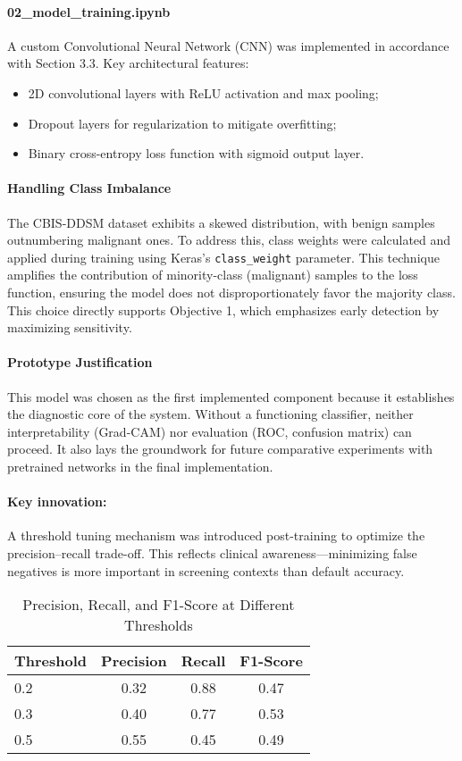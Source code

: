 \documentclass[12pt]{article}
\begin{document}
\paragraph{02\_model\_training.ipynb}
A custom Convolutional Neural Network (CNN) was implemented in accordance with Section 3.3. Key architectural features:
\begin{itemize}
    \item 2D convolutional layers with ReLU activation and max pooling;
    \item Dropout layers for regularization to mitigate overfitting;
    \item Binary cross-entropy loss function with sigmoid output layer.
\end{itemize}

\paragraph{Handling Class Imbalance} The CBIS-DDSM dataset exhibits a skewed distribution, with benign samples outnumbering malignant ones. To address this, class weights were calculated and applied during training using Keras’s \texttt{class\_weight} parameter. This technique amplifies the contribution of minority-class (malignant) samples to the loss function, ensuring the model does not disproportionately favor the majority class. This choice directly supports Objective 1, which emphasizes early detection by maximizing sensitivity.

\paragraph{Prototype Justification} This model was chosen as the first implemented component because it establishes the diagnostic core of the system. Without a functioning classifier, neither interpretability (Grad-CAM) nor evaluation (ROC, confusion matrix) can proceed. It also lays the groundwork for future comparative experiments with pretrained networks in the final implementation.

\paragraph{Key innovation:} A threshold tuning mechanism was introduced post-training to optimize the precision–recall trade-off. This reflects clinical awareness—minimizing false negatives is more important in screening contexts than default accuracy.

\begin{table}[H]
\centering
\caption{Precision, Recall, and F1-Score at Different Thresholds}
\begin{tabular}{lccc}
\toprule
Threshold & Precision & Recall & F1-Score \\
\midrule
0.2 & 0.32 & 0.88 & 0.47 \\
0.3 & 0.40 & 0.77 & 0.53 \\
0.5 & 0.55 & 0.45 & 0.49 \\
\bottomrule
\end{tabular}
\end{table}
\end{document}
